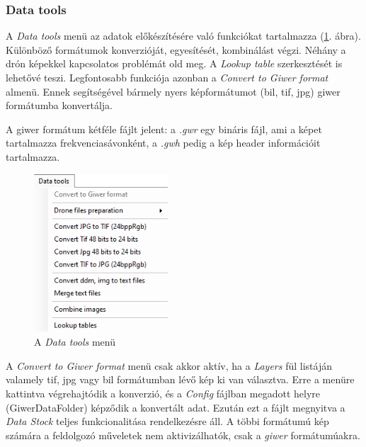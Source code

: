 \documentclass[a4paper,12pt]{article}
\begin{document}
\subsubsection{Data tools}

A \textit{Data tools} menü az adatok előkészítésére való funkciókat tartalmazza (\ref{fig:datatools_menu}. ábra). Különböző formátumok konverzióját, egyesítését, kombinálást végzi. Néhány a drón képekkel kapcsolatos problémát old meg. A \textit{Lookup table} szerkesztését is lehetővé teszi. Legfontosabb funkciója azonban a \textit{Convert to Giwer format} almenü. Ennek segítségével bármely nyers képformátumot (bil, tif, jpg) giwer formátumba konvertálja. 

A giwer formátum kétféle fájlt jelent: a \textit{.gwr} egy bináris fájl, ami a képet tartalmazza frekvenciasávonként, a \textit{.gwh} pedig a kép header információit tartalmazza.

\begin{figure}
	\centering
	\includegraphics[width=5cm]{datatools_menu.png}
	\caption{A \textit{Data tools} menü}
	\label{fig:datatools_menu}
\end{figure}


A \textit{Convert to Giwer format} menü csak akkor aktív, ha a \textit{Layers} fül listáján valamely tif, jpg vagy bil formátumban lévő kép ki van választva. Erre a menüre kattintva végrehajtódik a konverzió, és a \textit{Config} fájlban megadott helyre (GiwerDataFolder) képződik a konvertált adat. Ezután ezt a fájlt megnyitva a \textit{Data Stock} teljes funkcionalitása rendelkezésre áll. A többi formátumú kép számára a feldolgozó műveletek nem aktivizálhatók, csak a \textit{giwer} formátumúakra.
\end{document}
